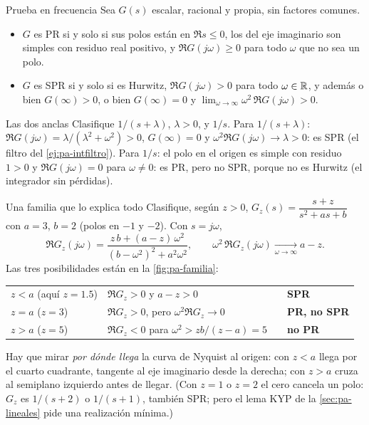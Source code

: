 \begin{lema}[label=lem:pa-prueba]{Prueba en frecuencia \citep[Def.~6.4 y Lema~6.1]{Kha02}}
Sea $G(s)$ escalar, racional y propia, sin factores comunes.
\begin{itemize}
  \item $G$ es PR si y solo si sus polos están en $\Re s\le0$, los del eje imaginario son simples con residuo real positivo, y $\Re G(j\omega)\ge0$ para todo $\omega$ que no sea un polo.
  \item $G$ es SPR si y solo si es Hurwitz, $\Re G(j\omega)>0$ para todo $\omega\in\mathbb{R}$, y además o bien $G(\infty)>0$, o bien $G(\infty)=0$ y $\displaystyle\lim_{\omega\to\infty}\omega^2\,\Re G(j\omega)>0$.
\end{itemize}
\end{lema}

\begin{ejemplo}[label=ej:pa-anclas]{Las dos anclas}
Clasifique $1/(s+\lambda)$, $\lambda>0$, y $1/s$.
\solucion Para $1/(s+\lambda)$: $\Re G(j\omega)=\lambda/(\lambda^2+\omega^2)>0$, $G(\infty)=0$ y $\omega^2\Re G(j\omega)\to\lambda>0$: es SPR (el filtro del \cref{ej:pa-intfiltro}). Para $1/s$: el polo en el origen es simple con residuo $1>0$ y $\Re G(j\omega)=0$ para $\omega\neq0$: es PR, pero no SPR, porque no es Hurwitz (el integrador sin pérdidas).
\end{ejemplo}

\begin{ejemplo}[label=ej:pa-familia]{Una familia que lo explica todo}
Clasifique, según $z>0$, $G_z(s)=\dfrac{s+z}{s^2+as+b}$ con $a=3$, $b=2$ (polos en $-1$ y $-2$).
\solucion Con $s=j\omega$,
\begin{equation}
  \Re G_z(j\omega)=\frac{z\,b+(a-z)\,\omega^2}{(b-\omega^2)^2+a^2\omega^2},
  \qquad
  \omega^2\,\Re G_z(j\omega)\xrightarrow[\omega\to\infty]{}a-z .
  \label{eq:pa-familia}
\end{equation}
Las tres posibilidades están en la \cref{fig:pa-familia}:
\begin{center}\small
\begin{tabular}{@{}llll@{}}
\toprule
$z<a$ (aquí $z=1.5$) & $\Re G_z>0$ y $a-z>0$ & & \textbf{SPR}\\
$z=a$ ($z=3$) & $\Re G_z>0$, pero $\omega^2\Re G_z\to0$ & & \textbf{PR, no SPR}\\
$z>a$ ($z=5$) & $\Re G_z<0$ para $\omega^2>zb/(z-a)=5$ & & \textbf{no PR}\\
\bottomrule
\end{tabular}
\end{center}
Hay que mirar \emph{por dónde llega} la curva de Nyquist al origen: con $z<a$ llega por el cuarto cuadrante, tangente al eje imaginario desde la derecha; con $z>a$ cruza al semiplano izquierdo antes de llegar. (Con $z=1$ o $z=2$ el cero cancela un polo: $G_z$ es $1/(s+2)$ o $1/(s+1)$, también SPR; pero el lema KYP de la \cref{sec:pa-lineales} pide una realización mínima.)
\end{ejemplo}

